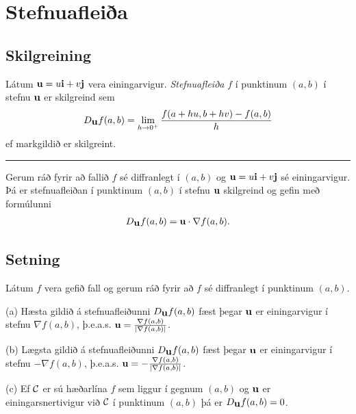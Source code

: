 \documentclass[a4paper,10pt,icelandic]{sphinxmanual}
\begin{document}
\section{Stefnuafleiða}
\label{Kafli2:stefnuafleia}\label{Kafli2:index-23}

\subsection{Skilgreining}
\label{Kafli2:id44}
Látum \(\mbox{${\bf u}$}=u\mbox{${\bf i}$}+v\mbox{${\bf j}$}\) vera
einingarvigur. \emph{Stefnuafleiða} \(f\) í punktinum \((a,b)\) í
stefnu \(\mbox{${\bf u}$}\) er skilgreind sem
\begin{gather}
\begin{split}\displaystyle D_{\mbox{${\bf u}$}}f(a,b)=\lim_{h\rightarrow 0^+}\frac{f(a+hu, b+hv)-f(a,b)}{h}\end{split}\notag
\end{gather}
ef markgildið er skilgreint.


\bigskip\hrule{}\bigskip


Gerum ráð fyrir að fallið \(f\) sé diffranlegt í \((a,b)\) og
\(\mbox{${\bf u}$}=u\mbox{${\bf i}$}+v\mbox{${\bf j}$}\) sé
einingarvigur. Þá er stefnuafleiðan í punktinum \((a,b)\) í stefnu
\(\mbox{${\bf u}$}\) skilgreind og gefin með formúlunni
\begin{gather}
\begin{split}\displaystyle D_{\mbox{${\bf u}$}}f(a,b)=\mbox{${\bf u}$}\cdot \nabla f(a,b).\end{split}\notag
\end{gather}

\subsection{Setning}
\label{Kafli2:id45}
Látum \(f\) vera gefið fall og gerum ráð fyrir að \(f\) sé
diffranlegt í punktinum \((a,b)\).

(a) Hæsta gildið á stefnuafleiðunni \(D_{\mbox{${\bf u}$}}f(a,b)\)
fæst þegar \(\mbox{${\bf u}$}\) er einingarvigur í stefnu
\(\nabla f(a,b)\), þ.e.a.s.
\(\mbox{${\bf u}$}=\frac{\nabla f(a,b)}{|\nabla f(a,b)|}\).

(b) Lægsta gildið á stefnuafleiðunni \(D_{\mbox{${\bf u}$}}f(a,b)\)
fæst þegar \(\mbox{${\bf u}$}\) er einingarvigur í stefnu
\(-\nabla f(a,b)\), þ.e.a.s.
\(\mbox{${\bf u}$}=-\frac{\nabla f(a,b)}{|\nabla f(a,b)|}\).

(c) Ef \(\cal C\) er sú hæðarlína \(f\) sem liggur í gegnum
\((a,b)\) og \(\mbox{${\bf u}$}\) er einingarsnertivigur við
\(\cal C\) í punktinum \((a,b)\) þá er
\(D_{\mbox{${\bf u}$}}f(a,b)=0\).
\end{document}
